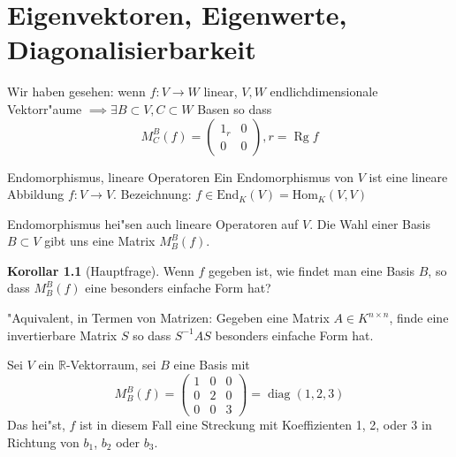 \documentclass[oneside,fontsize=11pt,paper=a4,BCOR=0mm,DIV=12,automark,headsepline]{scrbook}
\DeclareMathOperator{\mRg}{Rg}
\DeclareMathOperator{\mDiag}{diag}
\theoremstyle{remark}
\theoremstyle{definition}
\newtheorem*{korollar}{Korollar}
\theoremstyle{definition}
\theoremstyle{remark}
\begin{document}
\chapter{Eigenvektoren, Eigenwerte, Diagonalisierbarkeit}

Wir haben gesehen: wenn \(f: V\to W\) linear, \(V, W\) endlichdimensionale Vektorr"aume \(\implies \exists B\subset V, C\subset W \) Basen so dass
\[M^B_C(f) = \begin{pmatrix}
1_r & 0\\
0 & 0
\end{pmatrix}, r = \mRg f\]

\begin{definition}{Endomorphismus, lineare Operatoren}{}
	Ein Endomorphismus von \(V\) ist eine lineare Abbildung \(f: V\to V\). Bezeichnung: \(f\in \text{End}_K(V) = \text{Hom}_K(V,V) \)	
	
	Endomorphismus hei"sen auch lineare Operatoren auf \(V\). Die Wahl einer Basis \(B\subset V \) gibt uns eine Matrix \(M^B_B(f)\).
\end{definition}
\begin{korollar}[Hauptfrage]
	Wenn \(f\) gegeben ist, wie findet man eine Basis \(B\), so dass \(M^B_B(f)\) eine besonders einfache Form hat?
	
	"Aquivalent, in Termen von Matrizen: Gegeben eine Matrix \(A\in K^{n\times n} \), finde eine invertierbare Matrix \(S\) so dass \(S^{-1}AS\) besonders einfache Form hat.
\end{korollar}
  Sei \(V\) ein \(\mathbb{R}\)-Vektorraum, sei \(B\) eine Basis mit \[M^B_B(f) =
    \begin{pmatrix}
      1 & 0 & 0 \\
      0 & 2 & 0 \\
      0 & 0 & 3
    \end{pmatrix} = \mDiag(1,2,3) \]
  Das hei"st, \(f\) ist in diesem Fall eine Streckung mit Koeffizienten 1, 2, oder 3 in Richtung von \(b_1\), \(b_2\) oder \(b_{3}\).
\end{document}
